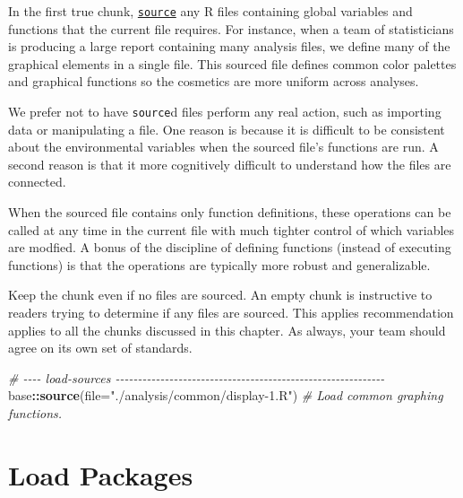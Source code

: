\documentclass[
]{book}
\newenvironment{Shaded}{\begin{snugshade}}{\end{snugshade}}
\newcommand{\CommentTok}[1]{\textcolor[rgb]{0.56,0.35,0.01}{\textit{#1}}}
\newcommand{\DataTypeTok}[1]{\textcolor[rgb]{0.13,0.29,0.53}{#1}}
\newcommand{\KeywordTok}[1]{\textcolor[rgb]{0.13,0.29,0.53}{\textbf{#1}}}
\newcommand{\NormalTok}[1]{#1}
\newcommand{\OperatorTok}[1]{\textcolor[rgb]{0.81,0.36,0.00}{\textbf{#1}}}
\newcommand{\StringTok}[1]{\textcolor[rgb]{0.31,0.60,0.02}{#1}}
\begin{document}
In the first true chunk, \href{https://stat.ethz.ch/R-manual/R-devel/library/base/html/source.html}{\texttt{source}} any R files containing global variables and functions that the current file requires. For instance, when a team of statisticians is producing a large report containing many analysis files, we define many of the graphical elements in a single file. This sourced file defines common color palettes and graphical functions so the cosmetics are more uniform across analyses.

We prefer not to have \texttt{source}d files perform any real action, such as importing data or manipulating a file. One reason is because it is difficult to be consistent about the environmental variables when the sourced file's functions are run. A second reason is that it more cognitively difficult to understand how the files are connected.

When the sourced file contains only function definitions, these operations can be called at any time in the current file with much tighter control of which variables are modfied. A bonus of the discipline of defining functions (instead of executing functions) is that the operations are typically more robust and generalizable.

Keep the chunk even if no files are sourced. An empty chunk is instructive to readers trying to determine if any files are sourced. This applies recommendation applies to all the chunks discussed in this chapter. As always, your team should agree on its own set of standards.

\begin{Shaded}
\begin{Highlighting}[]
\CommentTok{\# {-}{-}{-}{-} load{-}sources {-}{-}{-}{-}{-}{-}{-}{-}{-}{-}{-}{-}{-}{-}{-}{-}{-}{-}{-}{-}{-}{-}{-}{-}{-}{-}{-}{-}{-}{-}{-}{-}{-}{-}{-}{-}{-}{-}{-}{-}{-}{-}{-}{-}{-}{-}{-}{-}{-}{-}{-}{-}{-}{-}{-}{-}{-}{-}{-}{-}}
\NormalTok{base}\OperatorTok{::}\KeywordTok{source}\NormalTok{(}\DataTypeTok{file=}\StringTok{"./analysis/common/display{-}1.R"}\NormalTok{)      }\CommentTok{\# Load common graphing functions.}
\end{Highlighting}
\end{Shaded}

\hypertarget{chunk-load-packages}{%
\section{Load Packages}\label{chunk-load-packages}}
\end{document}
